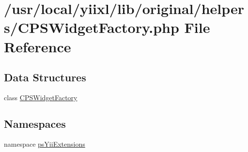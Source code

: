 \hypertarget{CPSWidgetFactory_8php}{
\section{/usr/local/yiixl/lib/original/helpers/CPSWidgetFactory.php File Reference}
\label{CPSWidgetFactory_8php}
}
\subsection*{Data Structures}
\begin{DoxyCompactItemize}
\item 
class \hyperlink{classCPSWidgetFactory}{CPSWidgetFactory}
\end{DoxyCompactItemize}
\subsection*{Namespaces}
\begin{DoxyCompactItemize}
\item 
namespace \hyperlink{namespacepsYiiExtensions}{psYiiExtensions}
\end{DoxyCompactItemize}
